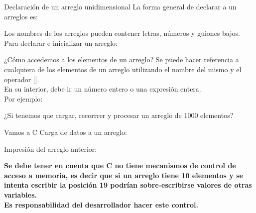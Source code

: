 \documentclass[xcolor=pdftex,table,11pt]{beamer}
\begin{document}
\begin{frame}{Declaración de un arreglo unidimensional}
La forma general de declarar a un arreglos es:

\codesetstylefrombeamer
{}

Los nombres de los arreglos pueden contener letras, números  y guiones bajos.\\

\vspace{0.5cm}
Para declarar e inicializar un arreglo:
\end{frame}



\begin{frame}{¿Cómo accedemos a los elementos de un arreglo?}
Se puede hacer referencia a cualquiera de los elementos de un arreglo  utilizando el nombre del mismo y el operador []. \\
En su interior, debe ir un número entero o una expresión entera. \\
Por ejemplo:

\codesetstylefrombeamer
{}


¿Si tenemos que cargar, recorrrer y procesar un arreglo de 1000 elementos?
\end{frame}



\begin{frame}[allowframebreaks]{Vamos a C}
Carga de datos a un arreglo:
\codesetstylefrombeamer
{}

\newpage
Impresión del arreglo anterior:
\codesetstylefrombeamer
{}


\href{https://github.com/danis963/informaticaI_IUA/blob/main/c/src/8-array_load_print.c}{}

\textbf{Se debe tener en cuenta que C no tiene mecanismos de control de acceso a memoria, es decir que si un arreglo tiene 10 elementos y se intenta escribir la posición 19 podrían sobre-escribirse valores de otras variables. \\
Es responsabilidad del desarrollador hacer este control.}

\end{frame}
\end{document}
